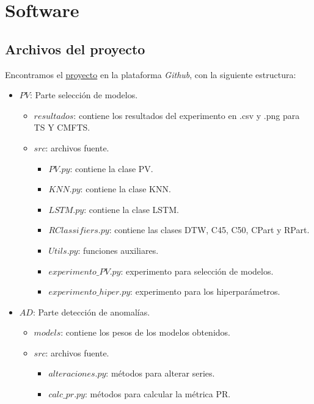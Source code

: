 
\chapter{Software}\label{ap:software}

\section{Archivos del proyecto}

Encontramos el \href{https://github.com/MiguelLentisco/tfg}{proyecto} en la plataforma \emph{Github}, con la siguiente estructura:

\begin{itemize}
  \item $PV$: Parte selección de modelos.
    \begin{itemize}
      \item $resultados$: contiene los resultados del experimento en .csv y .png para TS Y CMFTS.
      \item $src$: archivos fuente.
      \begin{itemize}
        \item $PV.py$: contiene la clase PV.
        \item $KNN.py$: contiene la clase KNN.
        \item $LSTM.py$: contiene la clase LSTM.
        \item $RClassifiers.py$: contiene las clases DTW, C45, C50, CPart y RPart.
        \item $Utils.py$: funciones auxiliares.
        \item $experimento\_PV.py$: experimento para selección de modelos.
        \item $experimento\_hiper.py$: experimento para los hiperparámetros.
      \end{itemize}
    \end{itemize}
  \item $AD$: Parte detección de anomalías.
    \begin{itemize}
      \item $models$: contiene los pesos de los modelos obtenidos.
      \item $src$: archivos fuente.
        \begin{itemize}
          \item $alteraciones.py$: métodos para alterar series.
          \item $calc\_pr.py$: métodos para calcular la métrica PR.

\end{itemize}
\end{itemize}
\end{itemize}
